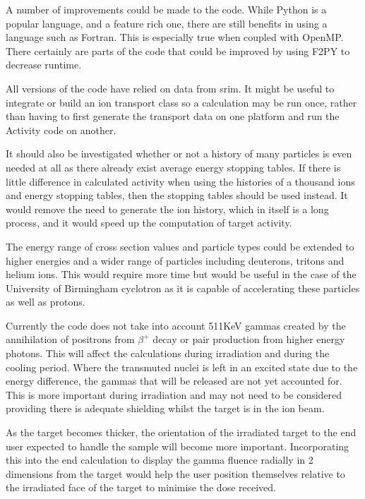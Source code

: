 A number of improvements could be made to the code.  While Python is a popular language, and a feature rich one, there are still benefits in using a language such as Fortran.  This is especially true when coupled with OpenMP.  There certainly are parts of the code that could be improved by using F2PY to decrease runtime.

All versions of the code have relied on data from \acrshort{srim}.  It might be useful to integrate or build an ion transport class so a calculation may be run once, rather than having to first generate the transport data on one platform and run the Activity code on another.  

It should also be investigated whether or not a history of many particles is even needed at all as there already exist average energy stopping tables.  If there is little difference in calculated activity when using the histories of a thousand ions and energy stopping tables, then the stopping tables should be used instead.  It would remove the need to generate the ion history, which in itself is a long process, and it would speed up the computation of target activity.

The energy range of cross section values and particle types could be extended to higher energies and a wider range of particles including deuterons, tritons and helium ions.  This would require more time but would be useful in the case of the University of Birmingham cyclotron as it is capable of accelerating these particles as well as protons.

Currently the code does not take into account 511KeV gammas created by the annihilation of positrons from $\beta^{+}$ decay or pair production from higher energy photons.  This will affect the calculations during irradiation and during the cooling period.  Where the transmuted nuclei is left in an excited state due to the energy difference, the gammas that will be released are not yet accounted for.  This is more important during irradiation and may not need to be considered providing there is adequate shielding whilst the target is in the ion beam.

As the target becomes thicker, the orientation of the irradiated target to the end user expected to handle the sample will become more important.  Incorporating this into the end calculation to display the gamma fluence radially in 2 dimensions from the target would help the user position themselves relative to the irradiated face of the target to minimise the dose received.

